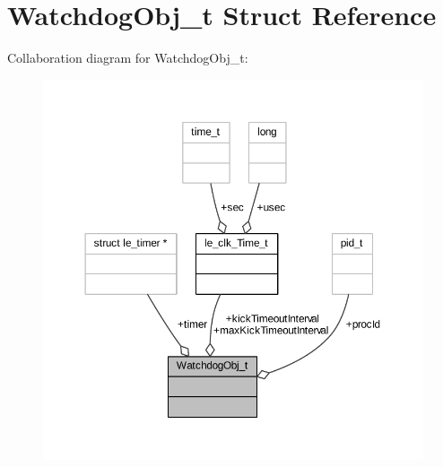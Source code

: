 \hypertarget{struct_watchdog_obj__t}{}\section{Watchdog\+Obj\+\_\+t Struct Reference}
\label{struct_watchdog_obj__t}


Collaboration diagram for Watchdog\+Obj\+\_\+t\+:
\nopagebreak
\begin{figure}[H]
\begin{center}
\leavevmode
\includegraphics[width=350pt]{struct_watchdog_obj__t__coll__graph}
\end{center}
\end{figure}
